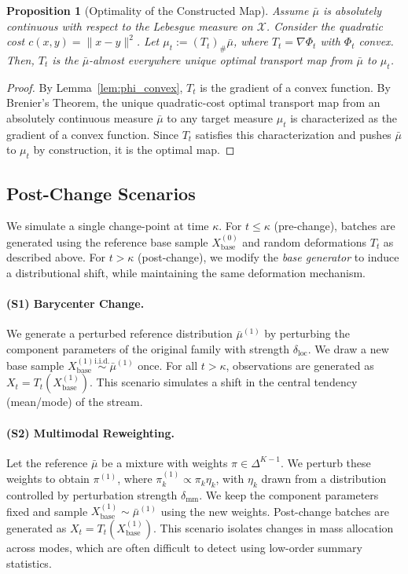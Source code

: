 \documentclass{article}
\theoremstyle{plain}
\newtheorem{proposition}[theorem]{Proposition}
\theoremstyle{definition}
\theoremstyle{remark}
\begin{document}
\begin{proposition}[Optimality of the Constructed Map]\label{prop:constructed_is_ot}
Assume $\bar{\mu}$ is absolutely continuous with respect to the Lebesgue measure on $\mathcal{X}$. Consider the quadratic cost $c(x,y) = \|x-y\|^2$. 
Let $\mu_t := (T_t)_{\#} \bar{\mu}$, where $T_t = \nabla \Phi_t$ with $\Phi_t$ convex. 
Then, $T_t$ is the $\bar{\mu}$-almost everywhere unique optimal transport map from $\bar{\mu}$ to $\mu_t$.
\end{proposition}

\begin{proof}
By Lemma~\ref{lem:phi_convex}, $T_t$ is the gradient of a convex function. 
By Brenier's Theorem, the unique quadratic-cost optimal transport map from an absolutely continuous measure $\bar{\mu}$ to any target measure $\mu_t$ is characterized as the gradient of a convex function. 
Since $T_t$ satisfies this characterization and pushes $\bar{\mu}$ to $\mu_t$ by construction, it is the optimal map.
\end{proof}

\subsection{Post-Change Scenarios}\label{app:post_change_scenarios}
We simulate a single change-point at time $\kappa$.
For $t \le \kappa$ (pre-change), batches are generated using the reference base sample $X_{\mathrm{base}}^{(0)}$ and random deformations $T_t$ as described above. 
For $t > \kappa$ (post-change), we modify the \emph{base generator} to induce a distributional shift, while maintaining the same deformation mechanism.

\paragraph{(S1) Barycenter Change.}We generate a perturbed reference distribution $\bar{\mu}^{(1)}$ by perturbing the component parameters of the original family with strength $\delta_{\mathrm{loc}}$. 
We draw a new base sample $X_{\mathrm{base}}^{(1)} \overset{\text{i.i.d.}}{\sim} \bar{\mu}^{(1)}$ once. For all $t > \kappa$, observations are generated as $X_t = T_t(X_{\mathrm{base}}^{(1)})$. 
This scenario simulates a shift in the central tendency (mean/mode) of the stream.

\paragraph{(S2) Multimodal Reweighting.}Let the reference $\bar{\mu}$ be a mixture with weights $\pi \in \Delta^{K-1}$.
We perturb these weights to obtain $\pi^{(1)}$, where $\pi^{(1)}_k \propto \pi_k \eta_k$, with $\eta_k$ drawn from a distribution controlled by perturbation strength $\delta_{\mathrm{mm}}$. 
We keep the component parameters fixed and sample $X_{\mathrm{base}}^{(1)} \sim \bar{\mu}^{(1)}$ using the new weights. Post-change batches are generated as $X_t = T_t(X_{\mathrm{base}}^{(1)})$. 
This scenario isolates changes in mass allocation across modes, which are often difficult to detect using low-order summary statistics.
\end{document}
